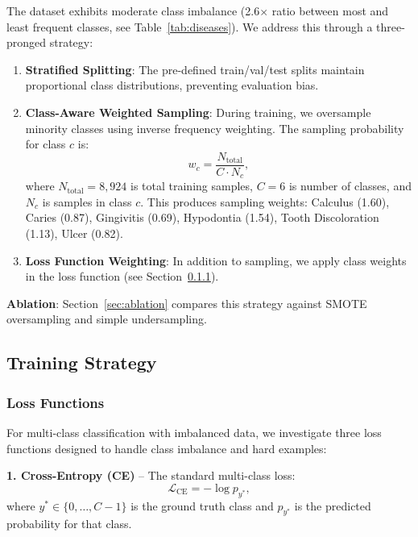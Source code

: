 The dataset exhibits moderate class imbalance (2.6$\times$ ratio between most and least frequent classes, see Table~\ref{tab:diseases}). We address this through a three-pronged strategy:

\begin{enumerate}
\item \textbf{Stratified Splitting}: The pre-defined train/val/test splits maintain proportional class distributions, preventing evaluation bias.

\item \textbf{Class-Aware Weighted Sampling}: During training, we oversample minority classes using inverse frequency weighting. The sampling probability for class $c$ is:
\begin{equation}
w_c = \frac{N_{\text{total}}}{C \cdot N_c},
\end{equation}
where $N_{\text{total}} = 8{,}924$ is total training samples, $C=6$ is number of classes, and $N_c$ is samples in class $c$. This produces sampling weights: Calculus (1.60), Caries (0.87), Gingivitis (0.69), Hypodontia (1.54), Tooth Discoloration (1.13), Ulcer (0.82).

\item \textbf{Loss Function Weighting}: In addition to sampling, we apply class weights in the loss function (see Section~\ref{subsec:loss}).
\end{enumerate}

\textbf{Ablation}: Section~\ref{sec:ablation} compares this strategy against SMOTE oversampling and simple undersampling.

\subsection{Training Strategy}
\label{subsec:training}

\subsubsection{Loss Functions}
\label{subsec:loss}

For multi-class classification with imbalanced data, we investigate three loss functions designed to handle class imbalance and hard examples:

\textbf{1. Cross-Entropy (CE)} -- The standard multi-class loss:
\begin{equation}
\mathcal{L}_{\text{CE}} = -\log p_{y^*},
\end{equation}
where $y^* \in \{0, \ldots, C-1\}$ is the ground truth class and $p_{y^*}$ is the predicted probability for that class.

